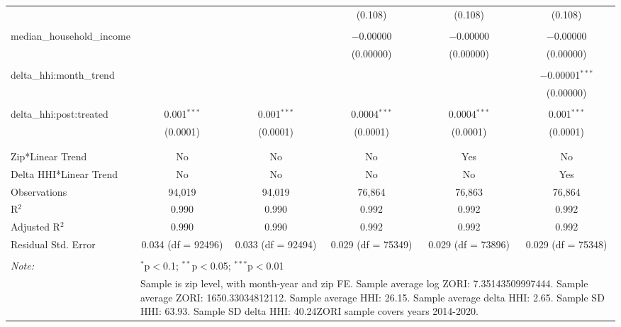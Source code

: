 \begin{table}[H]
{\begin{tabular}{@{\extracolsep{5pt}}lccccc}
   &  &  & (0.108) & (0.108) & (0.108) \\  

   & & & & & \\  

  median\_household\_income &  &  & $-$0.00000 & $-$0.00000 & $-$0.00000 \\  

   &  &  & (0.00000) & (0.00000) & (0.00000) \\  

   & & & & & \\  

  delta\_hhi:month\_trend &  &  &  &  & $-$0.00001$^{***}$ \\  

   &  &  &  &  & (0.00000) \\  

   & & & & & \\  

  delta\_hhi:post:treated & 0.001$^{***}$ & 0.001$^{***}$ & 0.0004$^{***}$ & 0.0004$^{***}$ & 0.001$^{***}$ \\  

   & (0.0001) & (0.0001) & (0.0001) & (0.0001) & (0.0001) \\  

   & & & & & \\  

 \hline \\[-1.8ex]  

 Zip*Linear Trend & No & No & No & Yes & No \\  

 Delta HHI*Linear Trend & No & No & No & No & Yes \\  

 Observations & 94,019 & 94,019 & 76,864 & 76,863 & 76,864 \\  

 R$^{2}$ & 0.990 & 0.990 & 0.992 & 0.992 & 0.992 \\  

 Adjusted R$^{2}$ & 0.990 & 0.990 & 0.992 & 0.992 & 0.992 \\  

 Residual Std. Error & 0.034 (df = 92496) & 0.033 (df = 92494) & 0.029 (df = 75349) & 0.029 (df = 73896) & 0.029 (df = 75348) \\  

 \hline  

 \hline \\[-1.8ex]  

 \textit{Note:}  & \multicolumn{5}{l}{$^{*}$p$<$0.1; $^{**}$p$<$0.05; $^{***}$p$<$0.01} \\  

  & \multicolumn{5}{l}{Sample is zip level, with month-year and zip FE. Sample average log ZORI: 7.35143509997444. Sample average ZORI: 1650.33034812112. Sample average HHI: 26.15. Sample average delta HHI: 2.65. Sample SD HHI: 63.93. Sample SD delta HHI: 40.24ZORI sample covers years 2014-2020.} \\  

 \end{tabular}}  

 \end{table}  

